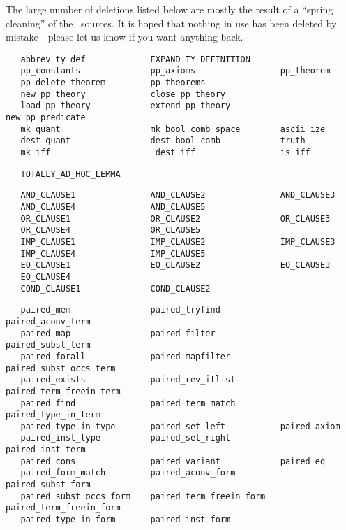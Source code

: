 The large number of deletions listed below are mostly the result of a ``spring
cleaning'' of the \HOL\ sources. It is hoped that nothing in use has been
deleted by mistake---please let us know if you want anything back.

\begin{hol}\begin{verbatim}
   abbrev_ty_def             EXPAND_TY_DEFINITION
   pp_constants              pp_axioms                 pp_theorem
   pp_delete_theorem         pp_theorems
   new_pp_theory             close_pp_theory
   load_pp_theory            extend_pp_theory          new_pp_predicate
   mk_quant                  mk_bool_comb space        ascii_ize 
   dest_quant                dest_bool_comb            truth 
   mk_iff                     dest_iff                 is_iff 
\end{verbatim}\end{hol}
\begin{hol}\begin{verbatim}
   TOTALLY_AD_HOC_LEMMA 
\end{verbatim}\end{hol}
\begin{hol}\begin{verbatim}
   AND_CLAUSE1               AND_CLAUSE2               AND_CLAUSE3    
   AND_CLAUSE4               AND_CLAUSE5
   OR_CLAUSE1                OR_CLAUSE2                OR_CLAUSE3     
   OR_CLAUSE4                OR_CLAUSE5
   IMP_CLAUSE1               IMP_CLAUSE2               IMP_CLAUSE3    
   IMP_CLAUSE4               IMP_CLAUSE5
   EQ_CLAUSE1                EQ_CLAUSE2                EQ_CLAUSE3     
   EQ_CLAUSE4
   COND_CLAUSE1              COND_CLAUSE2
\end{verbatim}\end{hol}
\begin{hol}\begin{verbatim}
   paired_mem                paired_tryfind            paired_aconv_term
   paired_map                paired_filter             paired_subst_term
   paired_forall             paired_mapfilter          paired_subst_occs_term
   paired_exists             paired_rev_itlist         paired_term_freein_term
   paired_find               paired_term_match         paired_type_in_term
   paired_type_in_type       paired_set_left           paired_axiom
   paired_inst_type          paired_set_right          paired_inst_term
   paired_cons               paired_variant            paired_eq
   paired_form_match         paired_aconv_form         paired_subst_form 
   paired_subst_occs_form    paired_term_freein_form   paired_term_freein_form
   paired_type_in_form       paired_inst_form    
\end{verbatim}\end{hol}
